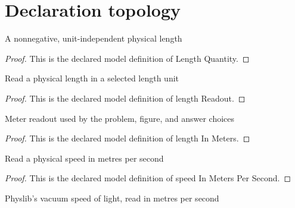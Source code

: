 \section{Declaration topology}
\begin{definition}
  \label{def:physics:phyx-mini-0622:phyxminiproblems-problemphyxmini0622-lengthquantity}
  A nonnegative, unit-independent physical length
\end{definition}
\begin{proof}
  This is the declared model definition of Length Quantity.
\end{proof}
\begin{definition}
  \label{def:physics:phyx-mini-0622:phyxminiproblems-problemphyxmini0622-lengthreadout}
  Read a physical length in a selected length unit
\end{definition}
\begin{proof}
  This is the declared model definition of length Readout.
\end{proof}
\begin{definition}
  \label{def:physics:phyx-mini-0622:phyxminiproblems-problemphyxmini0622-lengthinmeters}
  Meter readout used by the problem, figure, and answer choices
\end{definition}
\begin{proof}
  This is the declared model definition of length In Meters.
\end{proof}
\begin{definition}
  \label{def:physics:phyx-mini-0622:phyxminiproblems-problemphyxmini0622-speedinmeterspersecond}
  Read a physical speed in metres per second
\end{definition}
\begin{proof}
  This is the declared model definition of speed In Meters Per Second.
\end{proof}
\begin{definition}
  \label{def:physics:phyx-mini-0622:phyxminiproblems-problemphyxmini0622-vacuumspeedoflightinmeterspersecond}
  Physlib's vacuum speed of light, read in metres per second
\end{definition}
